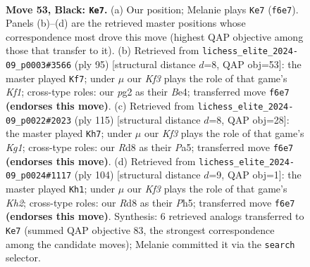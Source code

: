 \documentclass[11pt]{article}
\begin{document}
\clearpage

\begin{figure}[p]\centering
\begin{subfigure}{0.46\textwidth}\centering
\resizebox{\linewidth}{!}{%
\newchessgame
\chessboard[
  setfen={3r4/8/Q4k2/8/4P3/8/6PP/1K6 b - - 2 53},
  showmover=false,
  pgfstyle=straightmove, color=movearrow, markmove={f6-e7}
]}
\caption{}
\end{subfigure}\hfill
\begin{subfigure}{0.46\textwidth}\centering
\resizebox{\linewidth}{!}{%
\newchessgame
\chessboard[
  setfen={1Q3k2/3r4/8/5P2/4b2P/8/8/2K5 b - - 2 48},
  showmover=false,
  pgfstyle=straightmove, color=movearrow, markmove={f8-f7}
]}
\caption{}
\end{subfigure}
\\[4pt]
\begin{subfigure}{0.46\textwidth}\centering
\resizebox{\linewidth}{!}{%
\newchessgame
\chessboard[
  setfen={4Q1k1/8/5K1P/p7/8/P7/8/8 b - - 0 58},
  showmover=false,
  pgfstyle=straightmove, color=movearrow, markmove={g8-h7}
]}
\caption{}
\end{subfigure}\hfill
\begin{subfigure}{0.46\textwidth}\centering
\resizebox{\linewidth}{!}{%
\newchessgame
\chessboard[
  setfen={8/8/7p/7P/6q1/1k6/5p1K/8 w - - 0 53},
  showmover=false,
  pgfstyle=straightmove, color=movearrow, markmove={h2-h1}
]}
\caption{}
\end{subfigure}
\caption{\textbf{Move 53, Black: \texttt{Ke7}.} (a) Our position; Melanie plays \texttt{Ke7} (\texttt{f6e7}). Panels (b)--(d) are the retrieved master positions whose correspondence most drove this move (highest QAP objective among those that transfer to it). (b) Retrieved from \texttt{lichess\_elite\_2024-09\_p0003\#3566} (ply 95) [structural distance $d$=8, QAP obj=53]: the master played \texttt{Kf7}; under $\mu$ our \emph{Kf3} plays the role of that game's \emph{Kf1}; cross-type roles: our \emph{p}g2 as their \emph{B}e4; transferred move \texttt{f6e7} \textbf{(endorses this move)}. (c) Retrieved from \texttt{lichess\_elite\_2024-09\_p0022\#2023} (ply 115) [structural distance $d$=8, QAP obj=28]: the master played \texttt{Kh7}; under $\mu$ our \emph{Kf3} plays the role of that game's \emph{Kg1}; cross-type roles: our \emph{R}d8 as their \emph{P}a5; transferred move \texttt{f6e7} \textbf{(endorses this move)}. (d) Retrieved from \texttt{lichess\_elite\_2024-09\_p0024\#1117} (ply 104) [structural distance $d$=9, QAP obj=1]: the master played \texttt{Kh1}; under $\mu$ our \emph{Kf3} plays the role of that game's \emph{Kh2}; cross-type roles: our \emph{R}d8 as their \emph{P}h5; transferred move \texttt{f6e7} \textbf{(endorses this move)}. Synthesis: 6 retrieved analogs transferred to \texttt{Ke7} (summed QAP objective 83, the strongest correspondence among the candidate moves); Melanie committed it via the \texttt{search} selector.}
\label{fig:thought-m105}
\end{figure}
\end{document}

